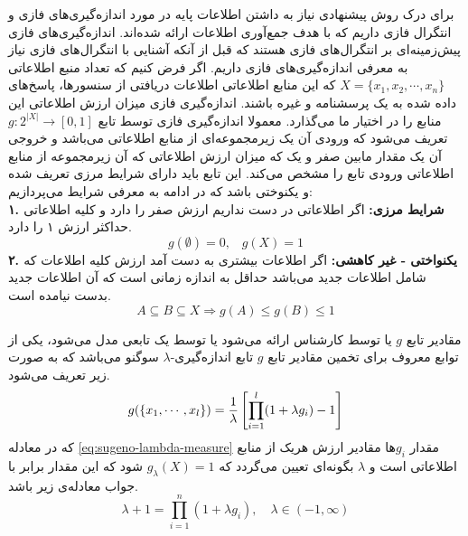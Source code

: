 \label{SEC:FI_PREVIEW}
برای درک روش پیشنهادی نیاز به داشتن اطلاعات پایه در مورد اندازه‌گیری‌های فازی و انتگرال فازی داریم که با هدف جمع‌آوری اطلاعات ارائه شده‌اند. اندازه‌گیری‌های فازی پیش‌زمینه‌ای بر انتگرال‌های فازی هستند که قبل از آنکه آشنایی با انتگرال‌های فازی نیاز به معرفی اندازه‌گیری‌های فازی داریم. اگر فرض کنیم که تعداد منبع اطلاعاتی
$X = \{x_1, x_2, \cdots, x_n\}$
که این منابع اطلاعاتی اطلاعات دریافتی از سنسورها، پاسخ‌های داده شده به یک پرسشنامه و غیره باشند. اندازه‌گیری فازی میزان ارزش اطلاعاتی این منابع را در اختیار ما می‌گذارد. معمولا اندازه‌گیری فازی توسط تابع
$g : 2^{|X|} \rightarrow [0, 1]$
تعریف می‌شود که ورودی آن یک زیرمجموعه‌ای از منابع اطلاعاتی می‌باشد و خروجی آن یک مقدار مابین صفر و یک که میزان ارزش اطلاعاتی که آن زیرمجموعه از منابع اطلاعاتی ورودی تابع را مشخص می‌کند.
این تابع باید دارای شرایط مرزی تعریف شده و یکنوختی باشد که در ادامه به معرفی شرایط می‌پردازیم:\\
\textbf{۱. شرایط مرزی:}
اگر اطلاعاتی در دست نداریم ارزش صفر را دارد و کلیه اطلاعاتی حداکثر ارزش ۱ را دارد.
\begin{equation}
g(\emptyset) = 0,\hspace{10pt} g(X) = 1
\end{equation}
\textbf{۲. یکنواختی - غیر کاهشی:}
اگر اطلاعات بیشتری به دست آمد ارزش کلیه اطلاعات که شامل اطلاعات جدید می‌باشد حداقل به اندازه زمانی است که آن اطلاعات جدید بدست نیامده است.
\begin{equation}
A \subseteq B \subseteq X \Rightarrow g(A) \leq g(B) \leq 1
\end{equation}

مقادیر تابع $g$ یا توسط کارشناس ارائه می‌شود یا توسط یک تابعی مدل می‌شود، یکی از توابع معروف برای تخمین مقادیر تابع $g$ تابع اندازه‌گیری-$\lambda$ سوگنو می‌باشد که به صورت زیر تعریف می‌شود.
\begin{equation}\label{eq:sugeno-lambda-measure}
g(\{x_1,\cdots,x_l\}) = {1 \over \lambda}\left[\prod_{i=1}^l(1 + \lambda g_i) - 1\right]
\end{equation}
که در معادله \ref{eq:sugeno-lambda-measure} مقدار $g_i$ها مقادیر ارزش هریک از منابع اطلاعاتی است و $\lambda$ بگونه‌ای تعیین می‌گردد که $g_\lambda(X) = 1$ شود که این مقدار برابر با جواب معادله‌ی زیر باشد.
\begin{equation}\label{eq:sugeno-lambda-measure:rooting}
\lambda + 1 = \prod_{i=1}^{n} (1 + \lambda g_i), \hspace{1em} \lambda \in (-1, \infty) 
\end{equation}

